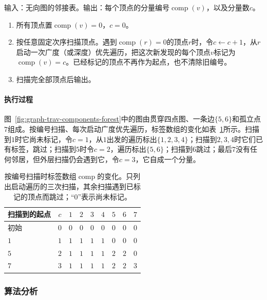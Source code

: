 \begin{algorithm}[无向连通分量编号]
\label{alg:graph-trav-components}
输入：无向图的邻接表。输出：每个顶点的分量编号$\operatorname{comp}(v)$，以及分量数$c$。
\begin{enumerate}
  \item 所有顶点置$\operatorname{comp}(v)=0$，$c=0$。
  \item 按任意固定次序扫描顶点。遇到$\operatorname{comp}(r)=0$的顶点$r$时，令$c\gets c+1$，从$r$启动一次广度（或深度）优先遍历，把这次新发现的每个顶点$v$标记为$\operatorname{comp}(v)=c$。已经标记的顶点不再作为起点，也不清除旧编号。
  \item 扫描完全部顶点后输出。
\end{enumerate}
\end{algorithm}

\paragraph{执行过程}
图~\ref{fig:graph-trav-components-forest}中的图由贯穿四点图、一条边$\{5,6\}$和孤立点$7$组成。按编号扫描、每次启动广度优先遍历，标签数组的变化如表~\ref{tab:graph-trav-components-trace}所示。扫描到$1$时它尚未标记，令$c=1$，从$1$出发的遍历标出$\{1,2,3,4\}$；扫描到$2,3,4$时它们已有标签，跳过；扫描到$5$时令$c=2$，遍历标出$\{5,6\}$；扫描到$6$跳过；最后$7$没有任何邻居，但外层扫描仍会遇到它，令$c=3$，它自成一个分量。

\begin{table}[!htb]
  \centering
  \caption{按编号扫描时标签数组$\operatorname{comp}$的变化。只列出启动遍历的三次扫描，其余扫描遇到已标记的顶点而跳过；“$0$”表示尚未标记。}
  \label{tab:graph-trav-components-trace}
  \small
  \begin{tabular}{@{}lcccccccc@{}}
    \toprule
    扫描到的起点 & $c$ & $1$ & $2$ & $3$ & $4$ & $5$ & $6$ & $7$ \\
    \midrule
    初始 & $0$ & $0$ & $0$ & $0$ & $0$ & $0$ & $0$ & $0$ \\
    $1$ & $1$ & $1$ & $1$ & $1$ & $1$ & $0$ & $0$ & $0$ \\
    $5$ & $2$ & $1$ & $1$ & $1$ & $1$ & $2$ & $2$ & $0$ \\
    $7$ & $3$ & $1$ & $1$ & $1$ & $1$ & $2$ & $2$ & $3$ \\
    \bottomrule
  \end{tabular}
\end{table}

\subsubsection{算法分析}

